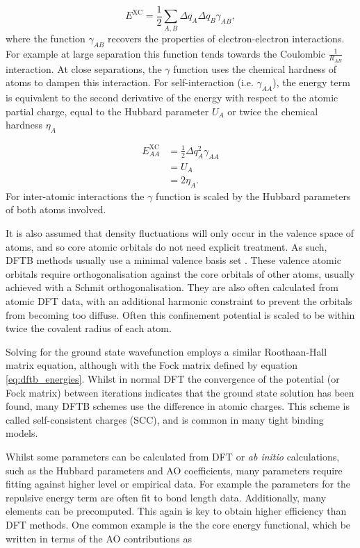 \begin{equation}
    E^{\text{XC}} = \frac{1}{2}\sum_{A,B} \Delta q_A \Delta q_B \gamma_{AB},
    \label{eq:dftb_e_ex}
\end{equation}
%
where the function $\gamma_{AB}$ recovers the properties of electron-electron interactions.
For example at large separation this function tends towards the Coulombic $\frac{1}{R_{AB}}$
interaction. At close separations, the $\gamma$ function uses the chemical hardness 
of atoms to dampen this interaction. For self-interaction (i.e. $\gamma_{AA}$), 
the energy term is equivalent to the second derivative of the energy with respect
to the atomic partial charge, equal to the Hubbard parameter $U_{A}$ or twice the chemical
hardness $\eta_{A}$

\begin{equation}
    \begin{split}
    E^{\text{XC}}_{AA} &= \frac{1}{2} \Delta q_A^2 \gamma_{AA} \\
    &= U_{A} \\
    &= 2 \eta_A.
    \end{split}
\end{equation}
%
For inter-atomic interactions the $\gamma$ function is scaled by the Hubbard parameters
of both atoms involved.

It is also assumed that density fluctuations will only occur in the valence space
of atoms, and so core atomic orbitals do not need explicit treatment. As such, DFTB
methods usually use a minimal valence basis set \cite{Bannwarth2020}. These valence
atomic orbitals require orthogonalisation against the core orbitals of other atoms,
usually achieved with a Schmit orthogonalisation. They are also often calculated
from atomic DFT data, with an additional harmonic constraint to prevent
the orbitals from becoming too diffuse. Often this confinement potential is scaled 
to be within twice the covalent radius of each atom.

Solving for the ground state wavefunction employs a similar Roothaan-Hall matrix
equation, although with the Fock matrix defined by equation \ref{eq:dftb_energies}.
Whilst in normal DFT the convergence of the potential (or Fock matrix) between iterations
indicates that the ground state solution has been found, many DFTB schemes use the
difference in atomic charges. This scheme is called self-consistent charges (SCC),
and is common in many tight binding models.

Whilst some parameters can be calculated from DFT or \emph{ab initio} calculations,
such as the Hubbard parameters and AO coefficients, many parameters require fitting
against higher level or empirical data. For example the parameters for the repulsive
energy term are often fit to bond length data. Additionally, many elements can be
precomputed. This again is key to obtain higher efficiency than DFT methods. One
common example is the the core energy functional, which be written in terms of the 
AO contributions as

